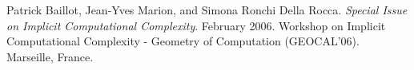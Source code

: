\begin{thebibliography}{9} %


Patrick Baillot, Jean-Yves Marion, and Simona Ronchi Della Rocca. \emph{Special
Issue on Implicit Computational Complexity}. February 2006. Workshop on
Implicit Computational Complexity - Geometry of Computation (GEOCAL'06).
Marseille, France.

\end{thebibliography}
